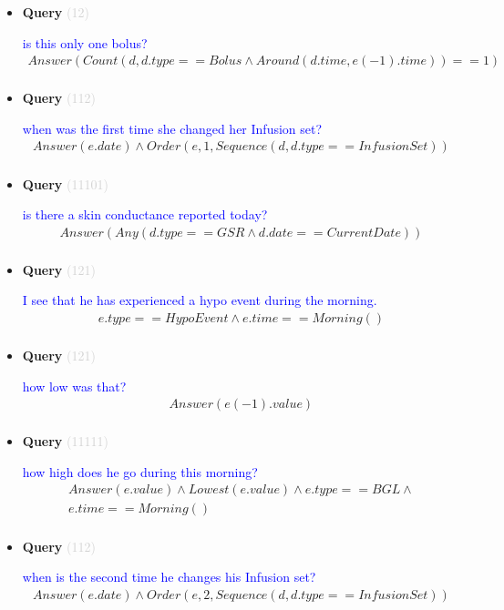 \documentclass[11pt]{article}
\newcommand{\key}[1]{\textcolor{lightgray}{#1}}
\newcounter{CQuery}
\begin{document}
\begin{itemize}
\item
\textbf{Query\theCQuery} \key{(12)} \addtocounter{CQuery}{1}
\textcolor{blue}{ is this only one bolus? }
\begin{multline*}
Answer(Count(d, d.type==Bolus \wedge Around(d.time, e(-1).time))==1) \\ 
\end{multline*}


\item
\textbf{Query\theCQuery} \key{(112)} \addtocounter{CQuery}{1}
\textcolor{blue}{ when was the first time she changed her Infusion set? }
\begin{multline*}
Answer(e.date) \wedge Order(e, 1, Sequence(d, d.type==InfusionSet)) \\ 
\end{multline*}


\item
\textbf{Query\theCQuery} \key{(11101)} \addtocounter{CQuery}{1}
\textcolor{blue}{ is there a skin conductance reported today? }
\begin{multline*}
Answer(Any(d.type==GSR \wedge d.date==CurrentDate)) \\ 
\end{multline*}


\item
\textbf{Query\theCQuery} \key{(121)} \addtocounter{CQuery}{1}
\textcolor{blue}{ I see that he has experienced a hypo event during the morning. }
\begin{multline*}
e.type==HypoEvent \wedge e.time==Morning() \\ 
\end{multline*}


\item
\textbf{Query\theCQuery} \key{(121)} \addtocounter{CQuery}{1}
\textcolor{blue}{ how low was that? }
\begin{multline*}
Answer(e(-1).value) \\ 
\end{multline*}


\item
\textbf{Query\theCQuery} \key{(11111)} \addtocounter{CQuery}{1}
\textcolor{blue}{ how high does he go during this morning? }
\begin{multline*}
Answer(e.value) \wedge Lowest(e.value) \wedge e.type==BGL \wedge \\ 
e.time==Morning() \\ 
\end{multline*}


\item
\textbf{Query\theCQuery} \key{(112)} \addtocounter{CQuery}{1}
\textcolor{blue}{ when is the second time he changes his Infusion set? }
\begin{multline*}
Answer(e.date) \wedge Order(e, 2, Sequence(d, d.type==InfusionSet)) \\ 
\end{multline*}



\end{itemize}
\end{document}
